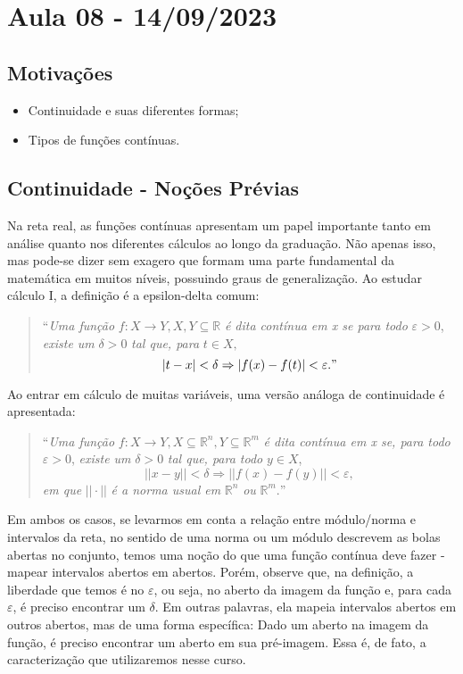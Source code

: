 \documentclass[metric_notes.tex]{subfiles}
\begin{document}
\section{Aula 08 - 14/09/2023}
\subsection{Motivações}
\begin{itemize}
	\item Continuidade e suas diferentes formas;
	\item Tipos de funções contínuas.
\end{itemize}
\subsection{Continuidade - Noções Prévias}
Na reta real, as funções contínuas apresentam um papel importante tanto em análise quanto nos diferentes cálculos ao longo da graduação. Não apenas isso, mas
pode-se dizer sem exagero que formam uma parte fundamental da matemática em muitos níveis, possuindo graus de generalização. Ao estudar cálculo I, a definição é
a epsilon-delta comum:
\begin{quote}
	``\textit{Uma função} \(f:X\rightarrow Y, X, Y\subseteq{\mathbb{R}}\) \textit{é dita contínua em x se para todo} \(\varepsilon >0\), \textit{existe um} \(\delta >0\) \textit{tal que, para }\(t\in X,\)
	\[
		|t-x| < \delta \Rightarrow |f(x)-f(t)| < \varepsilon."
	\]
\end{quote}

Ao entrar em cálculo de muitas variáveis, uma versão análoga de continuidade é apresentada:

\begin{quote}
	``\textit{Uma função} \(f:X\rightarrow Y, X\subseteq{\mathbb{R}^{n}}, Y\subseteq{\mathbb{R}^{m}}\) \textit{é dita contínua em x se, para todo} \(\varepsilon >0\), \textit{existe um }\(\delta >0\)
	\textit{tal que, para todo} \(y\in X\),
	\[
		||x-y|| < \delta \Rightarrow ||f(x)-f(y)|| < \varepsilon,
	\]
	\textit{em que} \(||\cdot ||\) \textit{é a norma usual em} \(\mathbb{R}^{n}\) \textit{ou }\(\mathbb{R}^{m}.\)''
\end{quote}
Em ambos os casos, se levarmos em conta a relação entre módulo/norma e intervalos da reta, no sentido de uma norma ou um módulo descrevem as bolas abertas no conjunto, temos uma noção
do que uma função contínua deve fazer - mapear intervalos abertos em abertos. Porém, observe que, na definição, a liberdade que temos é no \(\varepsilon \), ou seja, no aberto da imagem da função
e, para cada \(\varepsilon \), é preciso encontrar um \(\delta \). Em outras palavras, ela mapeia intervalos abertos em outros abertos, mas de uma forma específica: Dado um aberto na imagem da função,
é preciso encontrar um aberto em sua pré-imagem. Essa é, de fato, a caracterização que utilizaremos nesse curso.
\end{document}
